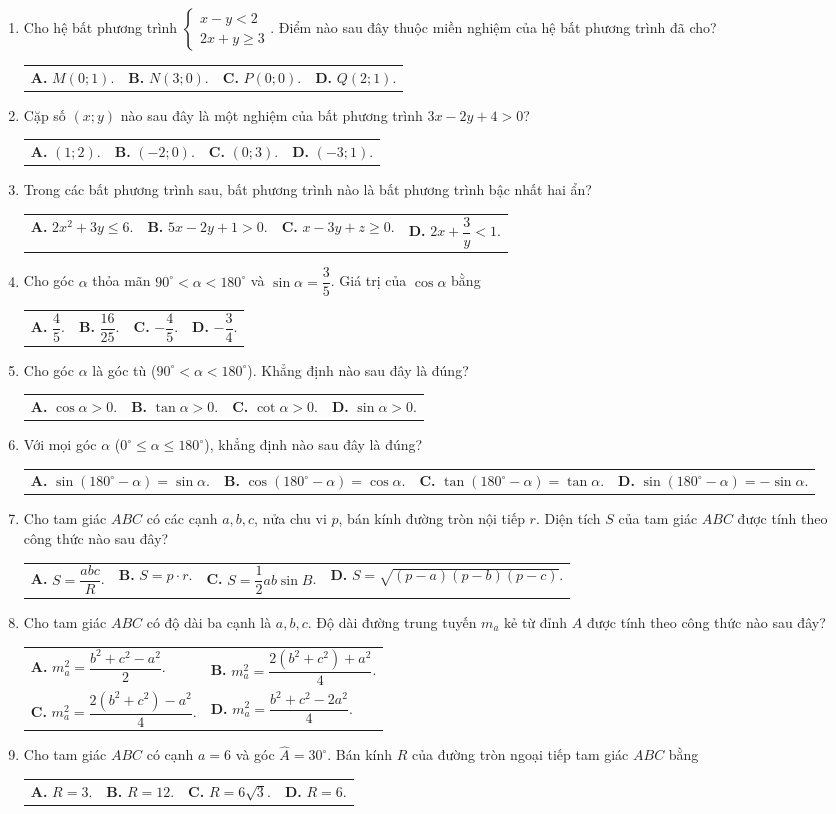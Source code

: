 \documentclass[12pt,a4paper]{article}
\makeatletter
\newcommand{\four}[4]{\par\noindent\begin{tabularx}{\linewidth}{@{}*{4}{>{\raggedright\arraybackslash}X}@{}}\textbf{A.} #1&\textbf{B.} #2&\textbf{C.} #3&\textbf{D.} #4\end{tabularx}}
\newcommand{\two}[4]{\par\noindent\begin{tabularx}{\linewidth}{@{}*{2}{>{\raggedright\arraybackslash}X}@{}}\textbf{A.} #1&\textbf{B.} #2\\[1.5pt]\textbf{C.} #3&\textbf{D.} #4\end{tabularx}}
\makeatother
\begin{document}
\begin{enumerate}
\item Cho hệ bất phương trình $\begin{cases} x - y < 2 \\ 2x + y \ge 3 \end{cases}$. Điểm nào sau đây thuộc miền nghiệm của hệ bất phương trình đã cho?
\four{$M(0; 1)$.}{$N(3; 0)$.}{$P(0; 0)$.}{$Q(2; 1)$.}

\item Cặp số $(x; y)$ nào sau đây là một nghiệm của bất phương trình $3x - 2y + 4 > 0$?
\four{$(1; 2)$.}{$(-2; 0)$.}{$(0; 3)$.}{$(-3; 1)$.}

\item Trong các bất phương trình sau, bất phương trình nào là bất phương trình bậc nhất hai ẩn?
\four{$2x^2 + 3y \le 6$.}{$5x - 2y + 1 > 0$.}{$x - 3y + z \ge 0$.}{$2x + \dfrac{3}{y} < 1$.}

\item Cho góc $\alpha$ thỏa mãn $90^\circ < \alpha < 180^\circ$ và $\sin \alpha = \dfrac{3}{5}$. Giá trị của $\cos \alpha$ bằng
\four{$\dfrac{4}{5}$.}{$\dfrac{16}{25}$.}{$-\dfrac{4}{5}$.}{$-\dfrac{3}{4}$.}

\item Cho góc $\alpha$ là góc tù ($90^\circ < \alpha < 180^\circ$). Khẳng định nào sau đây là đúng?
\four{$\cos \alpha > 0$.}{$\tan \alpha > 0$.}{$\cot \alpha > 0$.}{$\sin \alpha > 0$.}

\item Với mọi góc $\alpha$ ($0^\circ \le \alpha \le 180^\circ$), khẳng định nào sau đây là đúng?
\four{$\sin(180^\circ - \alpha) = \sin \alpha$.}{$\cos(180^\circ - \alpha) = \cos \alpha$.}{$\tan(180^\circ - \alpha) = \tan \alpha$.}{$\sin(180^\circ - \alpha) = -\sin \alpha$.}

\item Cho tam giác $ABC$ có các cạnh $a, b, c$, nửa chu vi $p$, bán kính đường tròn nội tiếp $r$. Diện tích $S$ của tam giác $ABC$ được tính theo công thức nào sau đây?
\four{$S = \dfrac{abc}{R}$.}{$S = p \cdot r$.}{$S = \dfrac{1}{2}ab\sin B$.}{$S = \sqrt{(p-a)(p-b)(p-c)}$.}

\item Cho tam giác $ABC$ có độ dài ba cạnh là $a, b, c$. Độ dài đường trung tuyến $m_a$ kẻ từ đỉnh $A$ được tính theo công thức nào sau đây?
\two{$m_a^2 = \dfrac{b^2 + c^2 - a^2}{2}$.}{$m_a^2 = \dfrac{2(b^2 + c^2) + a^2}{4}$.}{$m_a^2 = \dfrac{2(b^2 + c^2) - a^2}{4}$.}{$m_a^2 = \dfrac{b^2 + c^2 - 2a^2}{4}$.}

\item Cho tam giác $ABC$ có cạnh $a = 6$ và góc $\widehat{A} = 30^\circ$. Bán kính $R$ của đường tròn ngoại tiếp tam giác $ABC$ bằng
\four{$R = 3$.}{$R = 12$.}{$R = 6\sqrt{3}$.}{$R = 6$.}
\end{enumerate}
\end{document}
